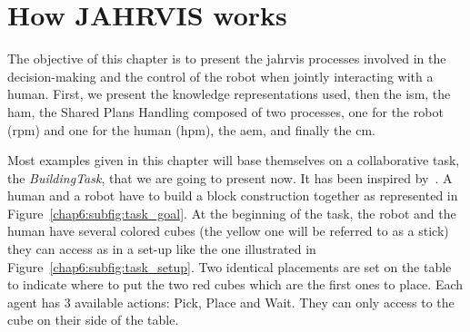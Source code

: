 \documentclass[a4paper,11pt,twoside]{StyleThese}
\begin{document}
	\setcounter{chapter}{5} %
	\dominitoc
	\faketableofcontents
	\fi

\chapter{How JAHRVIS works}\label{chapter:chap6}
\minitoc

The objective of this chapter is to present the \acrshort{jahrvis} processes involved in the decision-making and the control of the robot when jointly interacting with a human. First, we present the knowledge representations used, then the \acrlong{ism}, the \acrlong{ham}, the Shared Plans Handling composed of two processes, one for the robot (\acrlong{rpm}) and one for the human (\acrlong{hpm}), the \acrlong{aem}, and finally the \acrlong{cm}.

Most examples given in this chapter will base themselves on a collaborative task, the \textit{BuildingTask}, that we are going to present now. It has been inspired by~\cite{devin_2017_decisions}. A human and a robot have to build a block construction together as represented in Figure~\ref{chap6:subfig:task_goal}. At the beginning of the task, the robot and the human have several colored cubes (the yellow one will be referred to as a stick) they can access as in a set-up like the one illustrated in Figure~\ref{chap6:subfig:task_setup}. Two identical placements are set on the table to indicate where to put the two red cubes which are the first ones to place. Each agent has 3 available actions: Pick, Place and Wait. They can only access to the cube on their side of the table.
\end{document}
